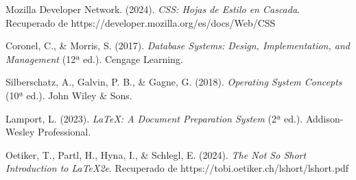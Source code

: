 \documentclass[12pt, letterpaper]{article}
\begin{document}
\begin{thebibliography}{99}
Mozilla Developer Network. (2024). \textit{CSS: Hojas de Estilo en Cascada}. Recuperado de https://developer.mozilla.org/es/docs/Web/CSS

Coronel, C., \& Morris, S. (2017). \textit{Database Systems: Design, Implementation, and Management} (12ª ed.). Cengage Learning.

Silberschatz, A., Galvin, P. B., \& Gagne, G. (2018). \textit{Operating System Concepts} (10ª ed.). John Wiley \& Sons.

Lamport, L. (2023). \textit{LaTeX: A Document Preparation System} (2ª ed.). Addison-Wesley Professional.

Oetiker, T., Partl, H., Hyna, I., \& Schlegl, E. (2024). \textit{The Not So Short Introduction to LaTeX2e}. Recuperado de https://tobi.oetiker.ch/lshort/lshort.pdf

\end{thebibliography}

\end{document}
